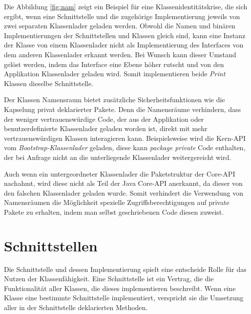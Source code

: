     Die Abbildung \ref{fig:nam} zeigt ein Beispiel für eine Klassenidentitätskrise, die sich ergibt, wenn eine Schnittstelle und die zugehörige Implementierung jeweils von zwei separaten Klassenlader geladen werden. Obwohl die Namen und binären Implementierungen der Schnittstellen und Klassen gleich sind, kann eine Instanz der Klasse von einem Klassenlader nicht als Implementierung des Interfaces von dem anderen Klassenlader erkannt werden. Bei Wunsch kann dieser Umstand gelöst werden, indem das Interface eine Ebene höher rutscht und von den Applikation Klassenlader geladen wird. Somit implementieren beide \textit{Print} Klassen dieselbe Schnittstelle.\bigbreak 

    Der Klassen Namensraum bietet zusätzliche Sicherheitsfunktionen wie die Kapselung privat deklarierter Pakete. Denn die Namensräume verhindern, dass der weniger vertrauenswürdige Code, der aus der Applikation oder benutzerdefinierte Klassenlader geladen worden ist, direkt mit mehr vertrauenswürdigen Klassen interagieren kann. Beispielsweise wird die Kern-API vom \textit{Bootstrap-Klassenlader} geladen, diese kann \textit{package private} Code enthalten, der bei Anfrage nicht an die unterliegende Klassenlader weitergereicht wird.


    Auch wenn ein untergeordneter Klassenlader die Paketstruktur der Core-API nachahmt, wird diese nicht als Teil der Java Core-API anerkannt, da dieser von den falschen Klassenlader geladen wurde. Somit verhindert die Verwendung von Namensräumen die Möglichkeit spezielle Zugriffsberechtigungen auf private Pakete zu erhalten, indem man selbst geschriebenen Code diesen zuweist. \cite{Forman04javareflection}


\section{Schnittstellen} \label{sec:kap}
  
  Die Schnittstelle und dessen Implementierung spielt eine entscheide Rolle für das Nutzen der Klassenfähigkeit. Eine Schnittstelle ist ein Vertrag, die die Funktionalität aller Klassen, die dieses implementieren beschreibt. Wenn eine Klasse eine bestimmte Schnittstelle implementiert, verspricht sie die Umsetzung aller in der Schnittstelle deklarierten Methoden.

